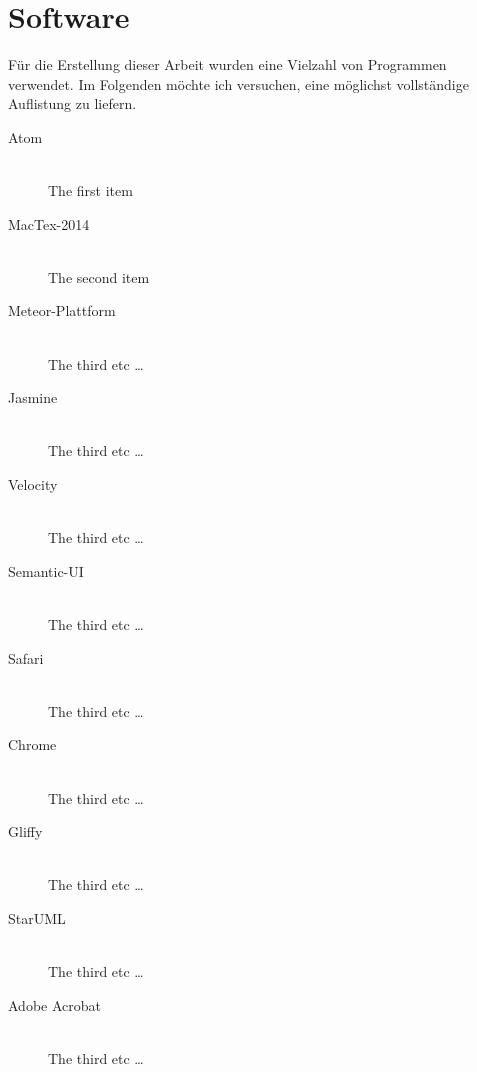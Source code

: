 

\chapter*{Software} %

Für die Erstellung dieser Arbeit wurden eine Vielzahl von Programmen verwendet.
Im Folgenden möchte ich versuchen, eine möglichst vollständige Auflistung zu
liefern.

\thispagestyle{empty}

\begin{description}
  \item[Atom] \hfill \\
  The first item
  \item[MacTex-2014] \hfill \\
  The second item
  \item[Meteor-Plattform] \hfill \\
  The third etc \ldots
  \item[Jasmine] \hfill \\
  The third etc \ldots
  \item[Velocity] \hfill \\
  The third etc \ldots
  \item[Semantic-UI] \hfill \\
  The third etc \ldots
  \item[Safari] \hfill \\
  The third etc \ldots
  \item[Chrome] \hfill \\
  The third etc \ldots
  \item[Gliffy] \hfill \\
  The third etc \ldots
  \item[StarUML] \hfill \\
  The third etc \ldots
  \item[Adobe Acrobat] \hfill \\
  The third etc \ldots
\end{description}

